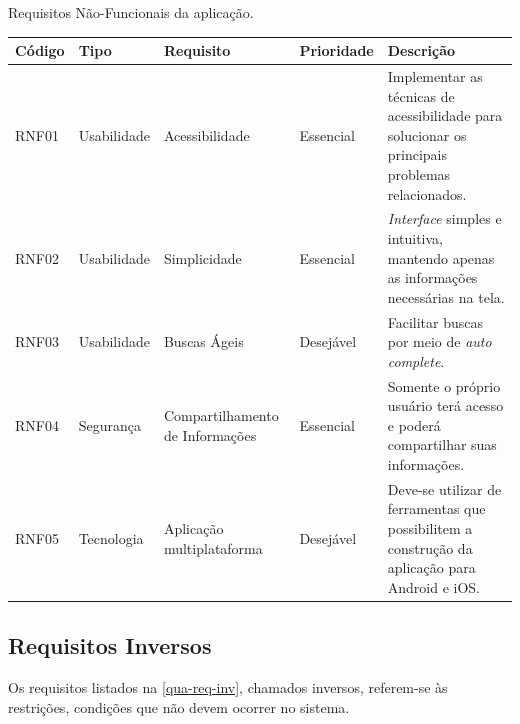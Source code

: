 \begin{quadro}[htb]
    \begin{center}
        \ABNTEXfontereduzida
        \caption{Requisitos Não-Funcionais da aplicação.}
        \label{qua-req-nf}
        \begin{tabular}{|p{1.1cm}|p{1.6cm}|p{3.0cm}|p{1.5cm}|p{6.7cm}|}
            \hline
            \textbf{Código} & \textbf{Tipo} & \textbf{Requisito}              & \textbf{Prioridade} & \textbf{Descrição} \\
            \hline
            RNF01           & Usabilidade   & Acessibilidade                  & Essencial           &
            Implementar as técnicas de acessibilidade para solucionar os principais problemas relacionados.              \\
            \hline
            RNF02           & Usabilidade   & Simplicidade                    & Essencial           &
            \emph{Interface} simples e intuitiva, mantendo apenas as informações necessárias na tela.                    \\
            \hline
            RNF03           & Usabilidade   & Buscas Ágeis                    & Desejável           &
            Facilitar buscas por meio de \emph{auto complete}.                                                           \\
            \hline
            RNF04           & Segurança     & Compartilhamento de Informações & Essencial           &
            Somente o próprio usuário terá acesso e poderá compartilhar suas informações.                                \\
            \hline
            RNF05           & Tecnologia    & Aplicação multiplataforma       & Desejável           &
            Deve-se utilizar de ferramentas que possibilitem a construção da aplicação para Android e iOS\@.             \\
            \hline
        \end{tabular}
    \end{center}
\end{quadro}

\subsection{Requisitos Inversos}

Os requisitos listados na \autoref{qua-req-inv}, chamados inversos, referem-se às restrições, condições que não devem ocorrer no sistema.

